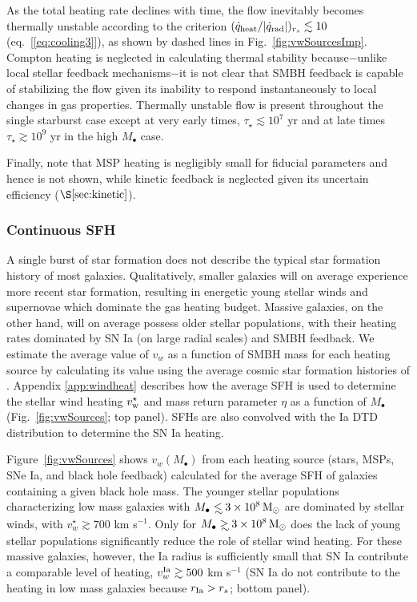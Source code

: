 \documentclass[usenatbib,fleqn]{mn2e}
\newcommand\lsim{\mathrel{\rlap{\lower4pt\hbox{\hskip1pt$\sim$}}
    \raise1pt\hbox{$<$}}}
\newcommand\gsim{\mathrel{\rlap{\lower4pt\hbox{\hskip1pt$\sim$}}
    \raise1pt\hbox{$>$}}}
\newcommand{\rs}{r_s}
\newcommand{\Mbh}[1][]{M_{\bullet#1}}
\newcommand{\vwO}{v_{w}}
\begin{document}
As the total heating rate declines with time, the flow inevitably becomes thermally unstable according to the criterion $(\dot{q}_{\rm heat}/|\dot{q}_{\rm rad}|)_{r_{s}} \lesssim 10$
(eq.~[\ref{eq:cooling3}]), as shown by dashed lines in
Fig.~\ref{fig:vwSourcesImp}.  Compton heating is neglected in
calculating thermal stability because$-$unlike local stellar feedback
mechanisms$-$it is not clear that SMBH feedback is capable of stabilizing the
flow given its inability to respond instantaneously to local changes
in gas properties.  Thermally unstable flow is present throughout the single starburst case except at very early times, $\tau_{\star} \lesssim 10^7$ yr and at late times $\tau_{\star}
\gtrsim 10^{9}$ yr in the high $M_{\bullet}$ case.

Finally, note that MSP heating is negligibly small for fiducial parameters and hence
is not shown, while kinetic feedback is neglected given its uncertain efficiency ($\S\ref{sec:kinetic}$).

\subsubsection{Continuous SFH}
A single burst of star formation does not describe the typical star
formation history of most galaxies.  Qualitatively, smaller galaxies
will on average experience more recent star formation, resulting in
energetic young stellar winds and supernovae which dominate the gas
heating budget.  Massive galaxies, on the other hand, will on average
possess older stellar populations, with their heating rates dominated
by SN Ia (on large radial scales) and SMBH feedback.  We estimate the
average value of $\vwO$ as a function of SMBH mass for each heating
source by calculating its value using the average cosmic star
formation histories of \citet{MosterNaab+:2013a}.  Appendix
\ref{app:windheat} describes how the average SFH is
used to determine the stellar wind heating $v_{\rm w}^{\star}$ and
mass return parameter $\eta$ as a function of $M_{\bullet}$
(Fig.~\ref{fig:vwSources}; top panel).  SFHs are also
convolved with the Ia DTD distribution to determine the SN Ia heating.

Figure~\ref{fig:vwSources} shows $\vwO(M_{\bullet})$ from each heating
source (stars, MSPs, SNe Ia, and black hole feedback) calculated for
the average SFH of galaxies containing a given black hole mass.  The
younger stellar populations characterizing low mass galaxies with $\Mbh\lsim
3\times 10^{8} \Msun$ are dominated by stellar winds, with
$v_{w}^{\star} \gtrsim 700$ km s$^{-1}$.  Only for $\Mbh\gsim 3\times
10^{8} \Msun$ does the lack of young stellar populations significantly
reduce the role of stellar wind heating.  For these massive
galaxies, however, the Ia radius is sufficiently small that SN Ia contribute
a comparable level of heating, $v_{w}^{\rm Ia} \gtrsim 500$ km
s$^{-1}$ (SN Ia do not contribute to the heating in low mass galaxies because $r_{\rm Ia} > \rs$; bottom panel).  
\end{document}
